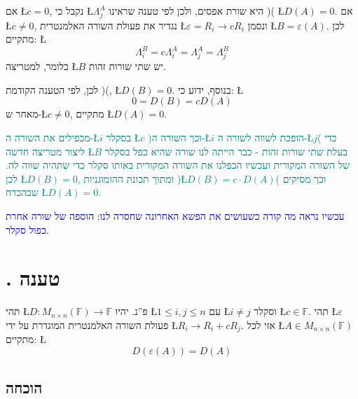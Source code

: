 \documentclass[english,hebrew]{article}
\begin{document}
אם \L{$c=0$}, נקבל כי \L{$\Lambda_{j}^{A}$} היא שורת אפסים, ולכן
לפי טענה שראינו ){\endL}( \L{$D(A)=0$}. אם \L{$c\neq0$},
נגדיר את פעולת השורה האלמנטרית \L{$\varepsilon=R_{i}\to cR_{i}$}
ונסמן \L{$B=\varepsilon(A)$}. לכן מתקיים: \L{%
\[
\Lambda_{i}^{B}=c\Lambda_{i}^{A}=\Lambda_{j}^{A}=\Lambda_{j}^{B}
\]
}%
כלומר, למטריצה \L{$B$} יש שתי שורות זהות.

לכן, לפי הטענה הקודמת ){\endL}(, \L{$D(B)=0$}. בנוסף, ידוע
כי: \L{%
\[
0=D(B)=cD(A)
\]
}%
מאחר ש-\L{$c\neq0$}, מתקיים \L{$D(A)=0$}.

\medskip{}

\textcolor{teal}{מכפילים את השורה ה-\L{$i$} בסקלר \L{$c$} )וכך השורה
ה-\L{$i$} הופכת לשווה לשורה ה-\L{$j$}( כדי ליצור מטריצה חדשה \L{$B$}
בעלת שתי שורות זהות - כבר הייתה לנו שורה שהיא כפל בסקלר של השורה המקורית
ועכשיו הכפלנו את השורה המקורית באותו סקלר כדי שתהיה שווה לה. לכן \L{$D(B)=0$},
ומתוך תכונת ההומוגניות )\L{$D(B)=c\cdot D(A)$}( וכך מסיקים שבהכרח
\L{$D(A)=0$}.}

\medskip{}

\textcolor{blue}{עכשיו נראה מה קורה כשעושים את הפש\textquotedbl א
האחרונה שחסרה לנו: הוספה של שורה אחרת כפול סקלר.}

\section{{\endL}. טענה}

תהי \L{$D\colon M_{n\times n}(\mathbb{F})\to\mathbb{F}$} פ\textquotedblright נ.
יהיו \L{$1\le i,j\le n$} עם \L{$i\neq j$} וסקלר \L{$c\in\mathbb{F}$}.
תהי \L{$\varepsilon$} פעולת השורה האלמנטרית המוגדרת על ידי \L{$R_{i}\to R_{i}+cR_{j}$}.
אזי לכל \L{$A\in M_{n\times n}(\mathbb{F})$} מתקיים: \L{%
\[
D(\varepsilon(A))=D(A)
\]
}%

\subsection{הוכחה}
\end{document}

